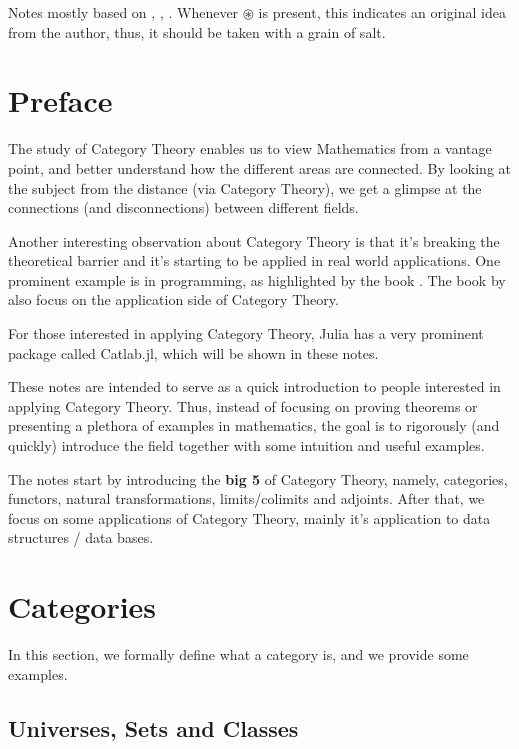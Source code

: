Notes mostly based on \citet{maico2020categoria},
\citet{bradley2020topology}, \citet{borceux1994handbook}.
Whenever $\circledast$ is present, this indicates an original idea from the author,
thus, it should be taken with a grain of salt.

\section{Preface}

The study of Category Theory enables us to view Mathematics from a vantage
point, and better understand how the different areas are connected.
By looking at the subject from the distance (via Category Theory), we get
a glimpse at the connections (and disconnections) between different fields.

Another interesting observation about Category Theory is that it's
breaking the theoretical barrier and it's starting to be applied
in real world applications. One prominent example is in programming,
as highlighted by the book \citet{milewski2018category}.
The book by \citet{fong2019invitation} also focus on the application
side of Category Theory.

For those interested in applying Category Theory, Julia has a very
prominent package called Catlab.jl, which will be shown in these notes.

These notes are intended to serve as a quick introduction to people interested
in applying Category Theory. Thus, instead of focusing on proving theorems
or presenting a plethora of examples in mathematics, the goal is to rigorously
(and quickly) introduce the field together with some intuition and useful examples.

The notes start by introducing the \textbf{big 5} of Category Theory, namely,
categories, functors, natural transformations, limits/colimits and adjoints.
After that, we focus on some applications of Category Theory,
mainly it's application to data structures / data bases.

\section{Categories}

In this section, we formally define what a category is, and we provide
some examples.

\subsection{Universes, Sets and Classes}

